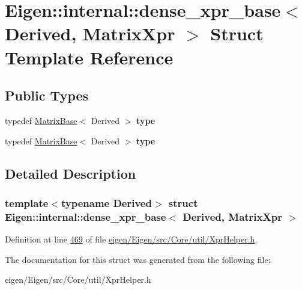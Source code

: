 \hypertarget{struct_eigen_1_1internal_1_1dense__xpr__base_3_01_derived_00_01_matrix_xpr_01_4}{}\section{Eigen\+:\+:internal\+:\+:dense\+\_\+xpr\+\_\+base$<$ Derived, Matrix\+Xpr $>$ Struct Template Reference}
\label{struct_eigen_1_1internal_1_1dense__xpr__base_3_01_derived_00_01_matrix_xpr_01_4}
\subsection*{Public Types}
\begin{DoxyCompactItemize}
\item 
\mbox{\label{struct_eigen_1_1internal_1_1dense__xpr__base_3_01_derived_00_01_matrix_xpr_01_4_a08a7453d950a372ef30fc1a1fdfc93ff}} 
typedef \hyperlink{group___core___module_class_eigen_1_1_matrix_base}{Matrix\+Base}$<$ Derived $>$ {\bfseries type}
\item 
\mbox{\label{struct_eigen_1_1internal_1_1dense__xpr__base_3_01_derived_00_01_matrix_xpr_01_4_a08a7453d950a372ef30fc1a1fdfc93ff}} 
typedef \hyperlink{group___core___module_class_eigen_1_1_matrix_base}{Matrix\+Base}$<$ Derived $>$ {\bfseries type}
\end{DoxyCompactItemize}


\subsection{Detailed Description}
\subsubsection*{template$<$typename Derived$>$\newline
struct Eigen\+::internal\+::dense\+\_\+xpr\+\_\+base$<$ Derived, Matrix\+Xpr $>$}



Definition at line \hyperlink{eigen_2_eigen_2src_2_core_2util_2_xpr_helper_8h_source_l00469}{469} of file \hyperlink{eigen_2_eigen_2src_2_core_2util_2_xpr_helper_8h_source}{eigen/\+Eigen/src/\+Core/util/\+Xpr\+Helper.\+h}.



The documentation for this struct was generated from the following file\+:\begin{DoxyCompactItemize}
\item 
eigen/\+Eigen/src/\+Core/util/\+Xpr\+Helper.\+h\end{DoxyCompactItemize}
